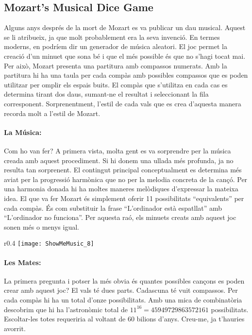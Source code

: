 \subsection{Mozart's Musical Dice Game}
Alguns anys després de la mort de Mozart es va publicar un dau musical. Aquest se li atribueix, ja que molt probablement era la seva invenció. En termes moderns, en podríem dir un generador de música aleatori. El joc permet la creació d'un minuet que sona bé i que el més possible és que no s'hagi tocat mai. Per això, Mozart presenta una partitura amb compassos numerats. Amb la partitura hi ha una taula per cada compàs amb possibles compassos que es poden utilitzar per omplir els espais buits. El compàs que s'utilitza en cada cas es determina tirant dos daus, sumant-ne el resultat i seleccionant la fila corresponent. Sorprenentment, l'estil de cada vals que es crea d'aquesta manera recorda molt a l'estil de Mozart.


\paragraph{La Música:} Com ho van fer? A primera vista, molta gent es va sorprendre per la música creada amb aquest procediment. Si hi donem una ullada més profunda, ja no resulta tan sorprenent. El contingut principal conceptualment es determina més aviat per la progressió harmònica que no per la melodia concreta de la cançó. Per una harmonia donada hi ha moltes maneres melòdiques d'expressar la mateixa idea. El que va fer Mozart és simplement oferir 11 possibilitats ``equivalents'' per cada compàs. És com substituir la frase ``L'ordinador està espatllat'' amb ``L'ordinador no funciona''. Per aquesta raó, els minuets creats amb aquest joc sonen més o menys igual.


\begin{wrapfigure}[22]{r}{0.4\textwidth}
\centering
\texttt{[image: ShowMeMusic\_8]}
\end{wrapfigure}

\paragraph{Les Mates:} La primera pregunta i potser la més obvia és quantes possibles cançons es poden crear amb aquest joc? El vals té dues parts. Cadascuna té vuit compassos. Per cada compàs hi ha un total d'onze possibilitats. Amb una mica de combinatòria descobrim que hi ha l'astronòmic total de $11^{16} = 45 949 729 863 572 161$ possibilitats. Escoltar-les totes requeriria al voltant de 60 bilions d'anys. Creu-me, ja t'hauries avorrit.

